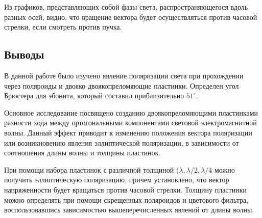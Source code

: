 Из графиков, представляющих собой фазы света, распространяющегося вдоль разных осей, видно, что вращение вектора будет осуществляться против часовой стрелки, если смотреть против пучка.

\subsection{Выводы}
В данной работе было изучено явление поляризации света при прохождении через поляроиды и двояко двоякопреломяющие пластинки. Определен угол Брюстера для эбонита, который составил приблизительно $51^\circ$. 

Основное исследование посвящено созданию двоякопреломяющими пластинками разности хода между ортогональными компонентами световой электромагнитной волны. Данный эффект приводит к изменению положения вектора поляризации или возникновению явления эллиптической поляризации, в зависимости от соотношения длины волны и толщины пластинок. 

При помощи набора пластинок с различной толщиной ($\lambda, \lambda / 2, \lambda / 4$ можно получить эллиптическую поляризацию, причем установлено, что вектор напряженности будет вращаться против часовой стрелки. Толщину пластинки можно определять при помощи скрещенных поляроидов и цветового фильтра, воспользовавшись зависимостью вышеперечисленных явлений от длины волны.